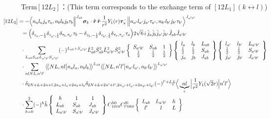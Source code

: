 \documentclass[master]{shnuthesis}
\newcommand{\llangle}{\big\langle\!\big\langle}
\newcommand{\rrangle}{\big\rangle\!\big\rangle}
\newcommand{\bmr}{\textbf{\textit{r}}}
\newcommand{\ap}{a^\prime}
\newcommand{\bp}{b^\prime}
\newcommand{\ii}{\!\!\!\!\!\!\!\!\!\!\!\!\!\!\!\!\!\!\!\!}
\begin{document}
\,\\
{\color{red}Term$[12L_2]$：}(This term corresponds to the exchange term of $[12L_1]$$(k \longleftrightarrow l)$)
\begin{align}
    &\ii [12L_2] = -\Big\langle n_a l_a j_a \tau_a, n_b l_b j_b \tau_b \Big\|^{J_{ab}} \bm{\sigma}_k\cdot\hat{\bmr}\,\hat{\bmr} \, \frac{1}{r^2}Y_1(r)\bm{\tau}_\times^- \Big\| n_{\ap} l_{\ap} j_{\ap} \tau_{\ap}, n_{\bp} l_{\bp} j_{\bp} \tau_{\bp} \Big\rangle^{J_{\ap \bp}} \notag\\
    & = \Big( \delta_{\tau_a,-\frac{1}{2}}\delta_{\tau_{\ap},\frac{1}{2}}\delta_{\tau_b,\tau_{\bp}}\tau_b - \delta_{\tau_b,-\frac{1}{2}}\delta_{\tau_{\bp},\frac{1}{2}}\delta_{\tau_a,\tau_{\ap}}\tau_a \Big) 2\sqrt{6}\,i\,\hat{j}_a\hat{j}_b\hat{j}_{\ap}\hat{j}_{\bp} \hat{J}_{ab}\hat{J}_{\ap\bp}  \notag \\
    & \cdot \sum_{L_{ab}S_{ab}L_{\ap\bp}S_{\ap\bp}} (-)^{L_{ab}+S_{\ap\bp}} \hat{L}_{ab}^2\hat{S}_{ab}^2\hat{L}_{\ap\bp}^2\hat{S}_{\ap\bp}^2  \left\{\begin{array}{ccc} S_{\ap\bp} & S_{ab} & 1 \\ \frac{1}{2} & \frac{1}{2} & \frac{1}{2} \end{array}\right\}  \left\{\begin{array}{lll}l_{a} & l_{b} & L_{ab} \\ \frac{1}{2} & \frac{1}{2} & S_{ab} \\j_{a} & j_{b} & J_{ab} \end{array}\right\} \left\{\begin{array}{lll}l_{\ap} & l_{\bp} & L_{\ap\bp} \\ \frac{1}{2} & \frac{1}{2} & S_{\ap\bp} \\j_{\ap} & j_{\bp} & J_{\ap\bp} \end{array}\right\}  \notag\\
    & \cdot \sum_{nlNL,n^\prime l^\prime} \llangle N L, n l \big| n_{a} l_{a}, n_{b} l_{b} \rrangle^{L_{ab}} \llangle N L, n^\prime l^\prime \big| n_{a^\prime} l_{a^\prime}, n_{b^\prime} l_{b^\prime} \rrangle^{L_{\ap\bp}} \notag\\
    & \cdot \delta_{2N+L+2n+l,2n_a+l_a+2n_b+l_b}\delta_{2N+L+2n^\prime+l^\prime,2n_{a^\prime}+l_{a^\prime}+2n_{b^\prime}+l_{b^\prime}} (-)^{l^\prime+L}\hat{l^\prime} \Big\langle \underbrace{n l}_{r} \Big| \frac{1}{r^2} Y_1(\sqrt{2}r) \Big| n^\prime l^\prime \Big\rangle  \notag\\
    & \cdot \sum_{h=0}^{2} (-)^{h}\hat{h} \left\{\begin{array}{lll} \,\,\,h & \,\,\,1 & \,\,\,1 \\ L_{ab} & S_{ab} & J_{ab} \\ L_{\ap\bp} & S_{\ap\bp} & J_{\ap\bp} \end{array}\right\}  C_{1010}^{h0}C_{l^\prime 0 h 0}^{l0}  \left\{\begin{array}{ccc} L_{ab} & L_{\ap\bp} & h \\ l^\prime & l & L \end{array}\right\}

\end{align}$$
\end{document}
